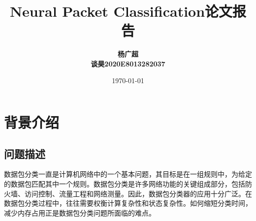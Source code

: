 \documentclass[UTF8,a4paper]{ctexart}
\title{\bfseries Neural Packet Classification论文报告 }
\author{\bfseries 杨广超\quad202028013229114\\\bfseries 谈昊\quad2020E8013282037}
\date{\today}
\begin{document}
\maketitle





\section{背景介绍}
\subsection{问题描述}
数据包分类一直是计算机网络中的一个基本问题，其目标是在一组规则中，为给定的数据包匹配其中一个规则。数据包分类是许多网络功能的关键组成部分，包括防火墙、访问控制、流量工程和网络测量。因此，数据包分类器的应用十分广泛。在数据包分类过程中，往往需要权衡计算复杂性和状态复杂性。如何缩短分类时间，减少内存占用正是数据包分类问题所面临的难点。
\end{document}
